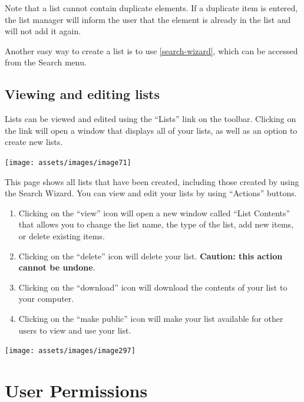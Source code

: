 \documentclass[
  12pt,
]{book}
\begin{document}
Note that a list cannot contain duplicate elements. If a duplicate item is entered, the list manager will inform the user that the element is already in the list and will not add it again.

Another easy way to create a list is to use \ref{search-wizard}, which can be accessed from the Search menu.

\hypertarget{viewing-and-editing-lists}{%
\subsection{Viewing and editing lists}\label{viewing-and-editing-lists}}

Lists can be viewed and edited using the ``Lists'' link on the toolbar. Clicking on the link will open a window that displays all of your lists, as well as an option to create new lists.

\begin{center}\texttt{[image: assets/images/image71]} \end{center}

This page shows all lists that have been created, including those created by using the Search Wizard. You can view and edit your lists by using ``Actions'' buttons.

\begin{enumerate}
\def\labelenumi{\arabic{enumi}.}
\item
  Clicking on the ``view'' icon will open a new window called ``List Contents'' that allows you to change the list name, the type of the list, add new items, or delete existing items.
\item
  Clicking on the ``delete'' icon will delete your list. \textbf{Caution: this action cannot be undone}.
\item
  Clicking on the ``download'' icon will download the contents of your list to your computer.
\item
  Clicking on the ``make public'' icon will make your list available for other users to view and use your list.
\end{enumerate}

\begin{center}\texttt{[image: assets/images/image297]} \end{center}

\hypertarget{user-permissions}{%
\section{User Permissions}\label{user-permissions}}
\end{document}
